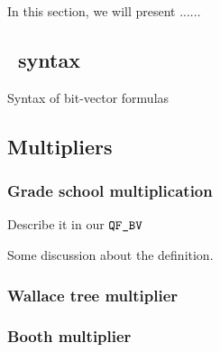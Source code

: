 In this section, we will present ...... 


\subsection{\qfbv~syntax}

Syntax of bit-vector formulas

\subsection{Multipliers}

\subsubsection{Grade school multiplication}

Describe it in our $\texttt{QF\_BV}$



\begin{df}
  
\end{df}

Some discussion about the definition.

\begin{example}
  
\end{example}


\subsubsection{Wallace tree multiplier}

\subsubsection{Booth multiplier}






